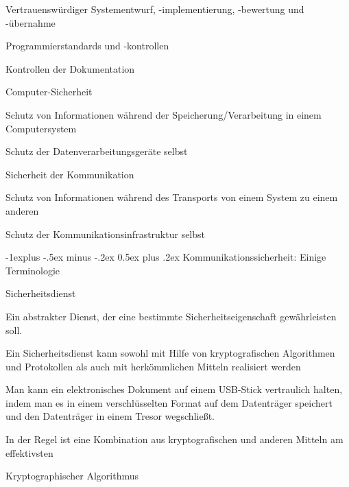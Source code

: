 \documentclass[a4paper]{article}
\makeatletter
\renewcommand{\subsection}{\@startsection{subsection}{2}{0mm}%
 {-1explus -.5ex minus -.2ex}%
 {0.5ex plus .2ex}%
 {\normalfont\normalsize\bfseries}}
\makeatother
\begin{document}
\begin{multicols}{3}
\begin{itemize*}
            \begin{itemize*}
                  \item Vertrauenswürdiger Systementwurf, -implementierung, -bewertung und -übernahme
                  \item Programmierstandards und -kontrollen
                  \item Kontrollen der Dokumentation
            \end{itemize*}
            \item
            Computer-Sicherheit

            \begin{itemize*}
                  \item Schutz von Informationen während der Speicherung/Verarbeitung in einem Computersystem
                  \item Schutz der Datenverarbeitungsgeräte selbst
            \end{itemize*}
            \item
            Sicherheit der Kommunikation

            \begin{itemize*}
                  \item Schutz von Informationen während des Transports von einem System zu einem anderen
                  \item Schutz der Kommunikationsinfrastruktur selbst
            \end{itemize*}
      \end{itemize*}


      \subsection{Kommunikationssicherheit: Einige
            Terminologie}

      \begin{itemize*}
            \item
            Sicherheitsdienst

            \begin{itemize*}
                  \item Ein abstrakter Dienst, der eine bestimmte Sicherheitseigenschaft gewährleisten soll.
                  \item Ein Sicherheitsdienst kann sowohl mit Hilfe von kryptografischen Algorithmen und Protokollen als auch mit herkömmlichen Mitteln realisiert werden
                  \begin{itemize*} \item Man kann ein elektronisches Dokument auf einem USB-Stick vertraulich halten, indem man es in einem verschlüsselten Format auf dem Datenträger speichert und den Datenträger in einem Tresor wegschließt. \item In der Regel ist eine Kombination aus kryptografischen und anderen Mitteln am effektivsten \end{itemize*}
            \end{itemize*}
            \item
            Kryptographischer Algorithmus


\end{itemize*}
\end{multicols}
\end{document}
